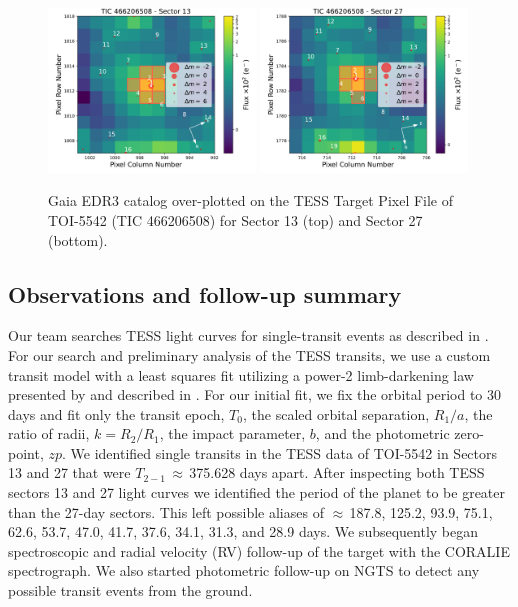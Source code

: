 \documentclass{aa}
\begin{document}
\begin{figure}
  \centering
  \includegraphics[width=0.49\textwidth]{figures/TPF_Gaia_TIC466206508_S13.pdf}
    \includegraphics[width=0.49\textwidth]{figures/TPF_Gaia_TIC466206508_S27.pdf}
 \caption{Gaia EDR3 catalog over-plotted on the TESS Target Pixel File of TOI-5542 (TIC 466206508) for Sector 13 (top) and Sector 27 (bottom).}
  \label{fig:tpfplot}
\end{figure}

\subsection{Observations and follow-up summary}

Our team searches TESS light curves for single-transit events as described in \citet{Gill2020a,Gill2020b,Gill2020c}. For our search and preliminary analysis of the TESS transits, we use a custom transit model with a least squares fit utilizing a power-2 limb-darkening law presented by \citet{Maxted2019} and described in \citet{Gill2020a}. For our initial fit, we fix the orbital period to 30 days and fit only the transit epoch, $T_0$, the scaled orbital separation, $R_1/a$, the ratio of radii, $k = R_2/R_1$, the impact parameter, $b$, and the photometric zero-point, $zp$. We identified single transits in the TESS data of TOI-5542 in Sectors 13 and 27 that were $T_{2-1}$\,$\approx$\,375.628 days apart. After inspecting both TESS sectors 13 and 27 light curves we identified the period of the planet to be greater than the 27-day sectors. This left possible aliases of $\approx$\,187.8, 125.2, 93.9, 75.1, 62.6, 53.7, 47.0, 41.7, 37.6, 34.1, 31.3, and 28.9 days. We subsequently began spectroscopic and radial velocity (RV) follow-up of the target with the CORALIE spectrograph. We also started photometric follow-up on NGTS to detect any possible transit events from the ground. 
\end{document}
